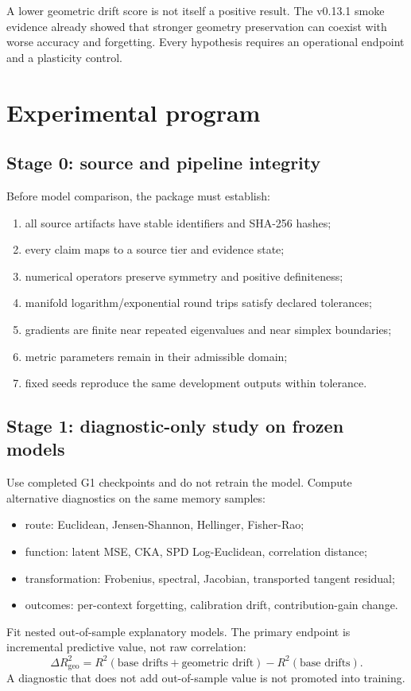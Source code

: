 \begin{warningbox}
A lower geometric drift score is not itself a positive result. The v0.13.1 smoke evidence already showed that stronger geometry preservation can coexist with worse accuracy and forgetting. Every hypothesis requires an operational endpoint and a plasticity control.
\end{warningbox}


\section{Experimental program}

\subsection{Stage 0: source and pipeline integrity}
Before model comparison, the package must establish:
\begin{enumerate}[leftmargin=1.7em]
  \item all source artifacts have stable identifiers and SHA-256 hashes;
  \item every claim maps to a source tier and evidence state;
  \item numerical operators preserve symmetry and positive definiteness;
  \item manifold logarithm/exponential round trips satisfy declared tolerances;
  \item gradients are finite near repeated eigenvalues and near simplex boundaries;
  \item metric parameters remain in their admissible domain;
  \item fixed seeds reproduce the same development outputs within tolerance.
\end{enumerate}

\subsection{Stage 1: diagnostic-only study on frozen models}
Use completed G1 checkpoints and do not retrain the model. Compute alternative diagnostics on the same memory samples:
\begin{itemize}[leftmargin=1.5em]
  \item route: Euclidean, Jensen-Shannon, Hellinger, Fisher-Rao;
  \item function: latent MSE, CKA, SPD Log-Euclidean, correlation distance;
  \item transformation: Frobenius, spectral, Jacobian, transported tangent residual;
  \item outcomes: per-context forgetting, calibration drift, contribution-gain change.
\end{itemize}
Fit nested out-of-sample explanatory models. The primary endpoint is incremental predictive value, not raw correlation:
\begin{equation}
  \Delta R^2_{\mathrm{geo}}
  = R^2(\text{base drifts}+\text{geometric drift})
    - R^2(\text{base drifts}).
\end{equation}
A diagnostic that does not add out-of-sample value is not promoted into training.

